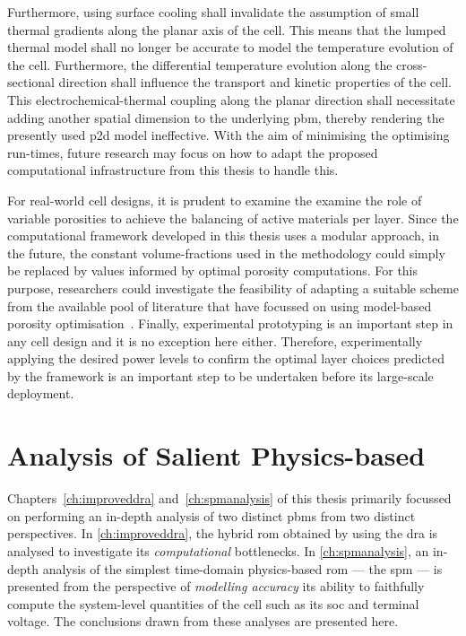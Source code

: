 Furthermore,  using surface  cooling shall  invalidate the  assumption of  small
thermal gradients along the planar axis of  the cell. This means that the lumped
thermal model  shall no longer  be accurate  to model the  temperature evolution
of  the cell.  Furthermore,  the differential  temperature  evolution along  the
cross-sectional direction  shall influence the transport  and kinetic properties
of the  cell. This electrochemical-thermal  coupling along the  planar direction
shall necessitate adding another spatial  dimension to the underlying \gls{pbm},
thereby rendering the  presently used \gls{p2d} model ineffective.  With the aim
of minimising  the optimising  run-times, future  research may  focus on  how to
adapt the proposed computational infrastructure from this thesis to handle this.

For  real-world cell  designs, it  is prudent  to examine  the examine  the role
of  variable  porosities  to  achieve  the balancing  of  active  materials  per
layer.  Since  the computational  framework  developed  in  this thesis  uses  a
modular  approach, in  the future,  the  constant volume-fractions  used in  the
methodology  could simply  be replaced  by values  informed by  optimal porosity
computations. For this purpose, researchers could investigate the feasibility of
adapting  a suitable  scheme from  the available  pool of  literature that  have
focussed  on  using  model-based  porosity  optimisation~\cite{Xue2013,Xue2014a,
Christensen2006}. Finally, experimental prototyping is  an important step in any
cell  design and  it  is  no exception  here  either. Therefore,  experimentally
applying the desired power levels to confirm the optimal layer choices predicted
by the  framework is an important  step to be undertaken  before its large-scale
deployment.


\section{Analysis of Salient Physics-based }

Chapters~\ref{ch:improveddra} and~\ref{ch:spmanalysis} of  this thesis primarily
focussed on performing an in-depth analysis of two distinct \glspl{pbm} from two
distinct perspectives.  In \cref{ch:improveddra}, the hybrid  \gls{rom} obtained
by  using the  \gls{dra}  is analysed  to  investigate its  \emph{computational}
bottlenecks.  In \cref{ch:spmanalysis},  an  in-depth analysis  of the  simplest
time-domain physics-based \gls{rom} --- the  \gls{spm} --- is presented from the
perspective of \emph{modelling accuracy} \ie{} its ability to faithfully compute
the  system-level quantities  of the  cell such  as its  \gls{soc} and  terminal
voltage. The conclusions drawn from these analyses are presented here.

